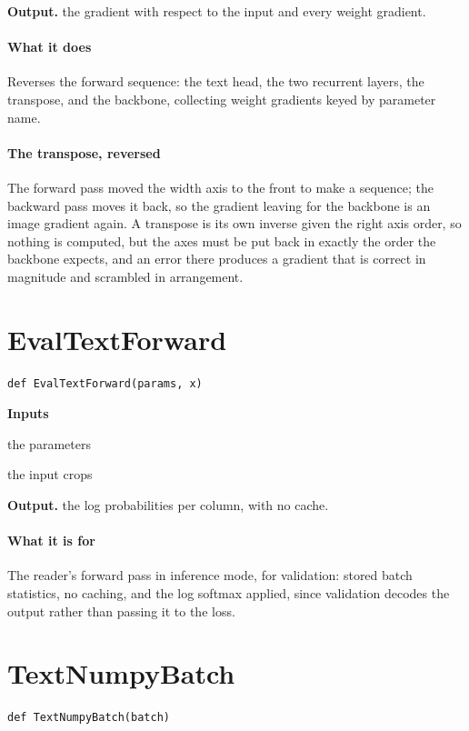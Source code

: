 \noindent\textbf{Output.} the gradient with respect to the input and every weight gradient.


\paragraph{What it does}
Reverses the forward sequence: the text head, the two recurrent layers, the transpose, and the backbone, collecting weight gradients keyed by parameter name.


\paragraph{The transpose, reversed}
The forward pass moved the width axis to the front to make a sequence; the backward pass moves it back, so the gradient leaving for the backbone is an image gradient again. A transpose is its own inverse given the right axis order, so nothing is computed, but the axes must be put back in exactly the order the backbone expects, and an error there produces a gradient that is correct in magnitude and scrambled in arrangement.


\section{EvalTextForward}
\begin{lstlisting}[style=sig]
def EvalTextForward(params, x)
\end{lstlisting}

\noindent\textbf{Inputs}
\begin{description}[leftmargin=2.2em,style=nextline,font=\normalfont\ttfamily]\setlength\itemsep{1pt}
  \item[{params}] \normalfont the parameters
  \item[{x}] \normalfont the input crops
\end{description}

\noindent\textbf{Output.} the log probabilities per column, with no cache.


\paragraph{What it is for}
The reader's forward pass in inference mode, for validation: stored batch statistics, no caching, and the log softmax applied, since validation decodes the output rather than passing it to the loss.


\section{TextNumpyBatch}
\begin{lstlisting}[style=sig]
def TextNumpyBatch(batch)
\end{lstlisting}

